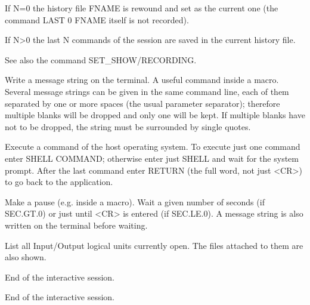 If N=0 the history file FNAME is rewound and set as the current one
(the command LAST 0 FNAME itself is not recorded).

If N>0 the last N commands of the session are saved in the
current history file.

See also the command SET\_SHOW/RECORDING.
\ENDTEXT

\BEGARG
{}
\ENDARG
\BEGTEXT
Write a message string on the terminal.
A useful command inside a macro.
Several message strings can be given in the same command line,
each of them separated by one or more spaces
(the usual parameter separator);
therefore multiple blanks will be dropped
and only one will be kept.
If multiple blanks have not to be dropped,
the string must be surrounded by single quotes.
\ENDTEXT

\BEGARG
{}
\ENDARG
\BEGTEXT
Execute a command of the host operating system.
To execute just one command enter SHELL COMMAND;
otherwise enter just SHELL and wait for the system prompt.
After the last command enter RETURN (the full word, not just <CR>)
to go back to the application.
\ENDTEXT

\BEGARG
{}
\ENDARG
\BEGTEXT
Make a pause (e.g. inside a macro).
Wait a given number of seconds (if SEC.GT.0)
or just until <CR> is entered (if SEC.LE.0).
A message string is also written on the terminal before waiting.
\ENDTEXT

\BEGTEXT
List all Input/Output logical units currently open.
The files attached to them are also shown.
\ENDTEXT

\BEGTEXT
End of the interactive session.
\ENDTEXT

\BEGTEXT
End of the interactive session.
\ENDTEXT

